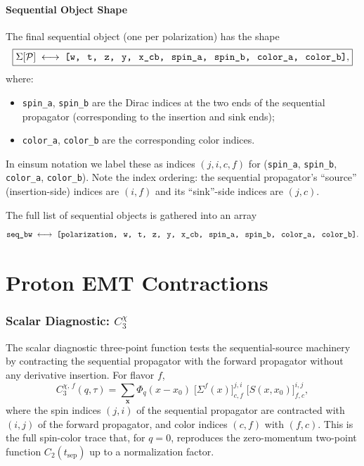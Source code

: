 \documentclass[11pt,a4paper]{article}
\newcommand{\PolProj}{\mathcal{P}}
\newcommand{\seqprop}{\Sigma}
\newcommand{\fwprop}{S}
\newcommand{\xsrc}{x_{0}}
\newcommand{\xins}{x}
\newcommand{\momtrans}{q}
\begin{document}
\subsection{Sequential Object Shape}

The final sequential object (one per polarization) has the shape
\begin{equation}
  \boxed{
  \seqprop[\PolProj]\; \longleftrightarrow\;
  \texttt{[w,\, t,\, z,\, y,\, x\_cb,\, spin\_a,\, spin\_b,\, color\_a,\, color\_b]},
  }
\end{equation}
where:
\begin{itemize}
  \item \texttt{spin\_a}, \texttt{spin\_b} are the Dirac indices at the two ends
        of the sequential propagator (corresponding to the insertion and sink ends);
  \item \texttt{color\_a}, \texttt{color\_b} are the corresponding color indices.
\end{itemize}
In einsum notation we label these as indices $(j,i,c,f)$ for
(\texttt{spin\_a}, \texttt{spin\_b}, \texttt{color\_a}, \texttt{color\_b}).
Note the index ordering: the sequential propagator's ``source'' (insertion-side)
indices are $(i,f)$ and its ``sink''-side indices are $(j,c)$.

The full list of sequential objects is gathered into an array
\begin{equation}
  \texttt{seq\_bw}\;\longleftrightarrow\;
  \texttt{[polarization,\, w,\, t,\, z,\, y,\, x\_cb,\, spin\_a,\, spin\_b,\, color\_a,\, color\_b]}.
\end{equation}

\part{Proton EMT Contractions}

\section{Scalar Diagnostic: $C_{3}^{\chi}$}

The scalar diagnostic three-point function tests the sequential-source machinery
by contracting the sequential propagator with the forward propagator without any
derivative insertion.  For flavor $f$,
\begin{equation}
  \boxed{
  C_{3}^{\chi,\,f}(\momtrans,\tau)
  = \sum_{\mathbf{x}}
    \Phi_{\momtrans}(\xins-\xsrc)\;
    \big[\seqprop^{f}(x)\big]^{j,i}_{c,f}\;
    \big[\fwprop(x,\xsrc)\big]^{i,j}_{f,c},
  }
  \label{eq:C3_chi}
\end{equation}
where the spin indices $(j,i)$ of the sequential propagator are contracted with
$(i,j)$ of the forward propagator, and color indices $(c,f)$ with $(f,c)$.  This
is the full spin-color trace that, for $\momtrans=0$, reproduces the zero-momentum
two-point function $C_{2}(t_{\text{sep}})$ up to a normalization factor.
\end{document}
